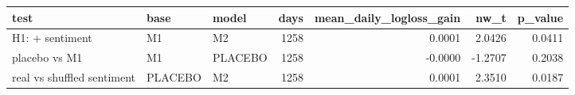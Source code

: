 \begin{tabular}{lllrrrr}
\toprule
test & base & model & days & mean\_daily\_logloss\_gain & nw\_t & p\_value \\
\midrule
H1: + sentiment & M1 & M2 & 1258 & 0.0001 & 2.0426 & 0.0411 \\
placebo vs M1 & M1 & PLACEBO & 1258 & -0.0000 & -1.2707 & 0.2038 \\
real vs shuffled sentiment & PLACEBO & M2 & 1258 & 0.0001 & 2.3510 & 0.0187 \\
\bottomrule
\end{tabular}
